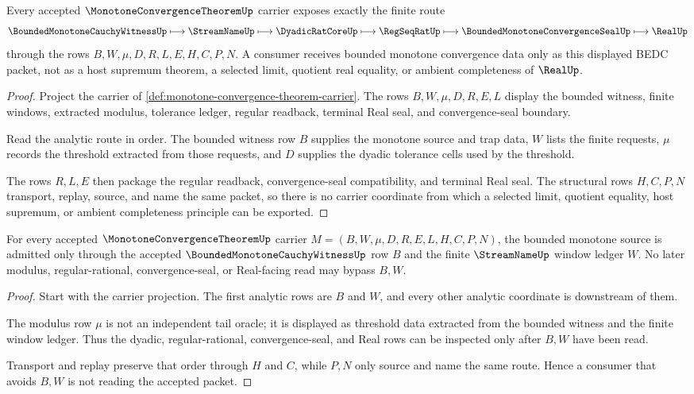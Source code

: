 \begin{theorem}
\label{thm:monotone-convergence-theorem-carrier}
Every accepted $\MonotoneConvergenceTheoremUp$ carrier exposes exactly the finite route
$$
\BoundedMonotoneCauchyWitnessUp \longmapsto \StreamNameUp \longmapsto \DyadicRatCoreUp \longmapsto \RegSeqRatUp \longmapsto \BoundedMonotoneConvergenceSealUp \longmapsto \RealUp
$$
through the rows $B,W,\mu,D,R,L,E,H,C,P,N$. A consumer receives bounded monotone convergence data only as this displayed BEDC packet, not as a host supremum theorem, a selected limit, quotient real equality, or ambient completeness of $\RealUp$.
\end{theorem}
\begin{proof}
Project the carrier of \autoref{def:monotone-convergence-theorem-carrier}. The rows $B,W,\mu,D,R,E,L$ display the bounded witness, finite windows, extracted modulus, tolerance ledger, regular readback, terminal Real seal, and convergence-seal boundary.

Read the analytic route in order. The bounded witness row $B$ supplies the monotone source and trap data, $W$ lists the finite requests, $\mu$ records the threshold extracted from those requests, and $D$ supplies the dyadic tolerance cells used by the threshold.

The rows $R,L,E$ then package the regular readback, convergence-seal compatibility, and terminal Real seal. The structural rows $H,C,P,N$ transport, replay, source, and name the same packet, so there is no carrier coordinate from which a selected limit, quotient equality, host supremum, or ambient completeness principle can be exported.
\end{proof}

\begin{theorem}
\label{thm:monotone-convergence-theorem-bounded-carrier-admission}
For every accepted $\MonotoneConvergenceTheoremUp$ carrier $M=(B,W,\mu,D,R,E,L,H,C,P,N)$, the bounded monotone source is admitted only through the accepted $\BoundedMonotoneCauchyWitnessUp$ row $B$ and the finite $\StreamNameUp$ window ledger $W$. No later modulus, regular-rational, convergence-seal, or Real-facing read may bypass $B,W$.
\end{theorem}
\begin{proof}
Start with the carrier projection. The first analytic rows are $B$ and $W$, and every other analytic coordinate is downstream of them.

The modulus row $\mu$ is not an independent tail oracle; it is displayed as threshold data extracted from the bounded witness and the finite window ledger. Thus the dyadic, regular-rational, convergence-seal, and Real rows can be inspected only after $B,W$ have been read.

Transport and replay preserve that order through $H$ and $C$, while $P,N$ only source and name the same route. Hence a consumer that avoids $B,W$ is not reading the accepted packet.
\end{proof}

